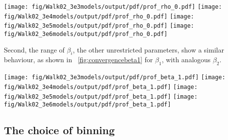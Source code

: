 \begin{figure*}
    \begin{center}
        \hspace{-7mm}
        \texttt{[image: fig/Walk02\_3e3models/output/pdf/prof\_rho\_0.pdf]}
        \texttt{[image: fig/Walk02\_3e4models/output/pdf/prof\_rho\_0.pdf]}
        \texttt{[image: fig/Walk02\_3e5models/output/pdf/prof\_rho\_0.pdf]}
        \texttt{[image: fig/Walk02\_3e6models/output/pdf/prof\_rho\_0.pdf]}
        \caption{Density profile of the Walk02 model after
          (3k,30k,300k,3000k) iterations (left to right). There is no
          signifikant change of the $2\sigma$ area swept by the models
        after 300k iterations.}
        \label{fig:convergencedens}
    \end{center}
\end{figure*}

Second, the range of $\beta_i$, the other unrestricted parameters, show
a similar behaviour, as shown in ~\ref{fig:convergencebeta1} for $\beta_1$,
with analogous $\beta_2$.

\begin{figure*}
   \begin{center}
       \hspace{-7mm}
       \texttt{[image: fig/Walk02\_3e3models/output/pdf/prof\_beta\_1.pdf]}
       \texttt{[image: fig/Walk02\_3e4models/output/pdf/prof\_beta\_1.pdf]}
       \texttt{[image: fig/Walk02\_3e5models/output/pdf/prof\_beta\_1.pdf]}
       \texttt{[image: fig/Walk02\_3e6models/output/pdf/prof\_beta\_1.pdf]}
       \caption{Convergence of $\beta_1$ after (3k, 30k, 300k, 3000k) iterations (left to right).}
       \label{fig:convergencebeta1}
   \end{center}
\end{figure*}


\subsection{The choice of binning}

